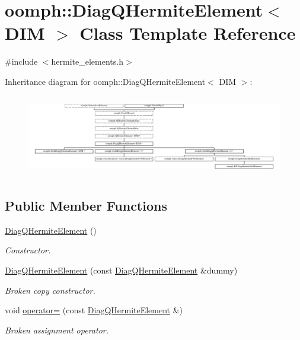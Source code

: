 \hypertarget{classoomph_1_1DiagQHermiteElement}{}\section{oomph\+:\+:Diag\+Q\+Hermite\+Element$<$ D\+IM $>$ Class Template Reference}
\label{classoomph_1_1DiagQHermiteElement}


{\ttfamily \#include $<$hermite\+\_\+elements.\+h$>$}

Inheritance diagram for oomph\+:\+:Diag\+Q\+Hermite\+Element$<$ D\+IM $>$\+:\begin{figure}[H]
\begin{center}
\leavevmode
\includegraphics[height=3.610315cm]{classoomph_1_1DiagQHermiteElement}
\end{center}
\end{figure}
\subsection*{Public Member Functions}
\begin{DoxyCompactItemize}
\item 
\hyperlink{classoomph_1_1DiagQHermiteElement_a49b5a9df09fa243aa9cfe8df37bcfe92}{Diag\+Q\+Hermite\+Element} ()
\begin{DoxyCompactList}\small\item\em Constructor. \end{DoxyCompactList}\item 
\hyperlink{classoomph_1_1DiagQHermiteElement_aba6e3c5c6b6219bba7e073f25c3ae994}{Diag\+Q\+Hermite\+Element} (const \hyperlink{classoomph_1_1DiagQHermiteElement}{Diag\+Q\+Hermite\+Element} \&dummy)
\begin{DoxyCompactList}\small\item\em Broken copy constructor. \end{DoxyCompactList}\item 
void \hyperlink{classoomph_1_1DiagQHermiteElement_a96a92b134a917b8e237f21ff4fd3e622}{operator=} (const \hyperlink{classoomph_1_1DiagQHermiteElement}{Diag\+Q\+Hermite\+Element} \&)
\begin{DoxyCompactList}\small\item\em Broken assignment operator. \end{DoxyCompactList}\end{DoxyCompactItemize}
